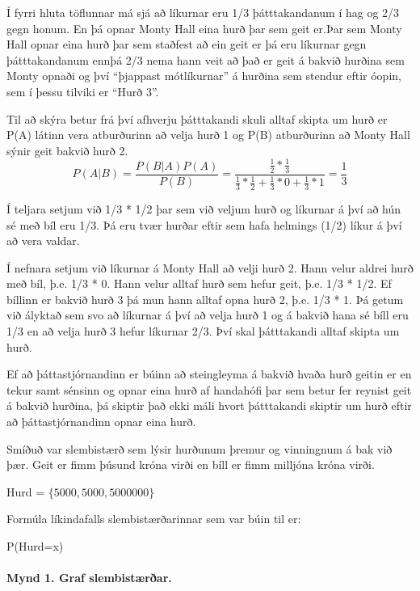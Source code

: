 \documentclass[
]{article}
\begin{document}
Í fyrri hluta töflunnar má sjá að líkurnar eru 1/3 þátttakandanum í hag
og 2/3 gegn honum. En þá opnar Monty Hall eina hurð þar sem geit er.Þar
sem Monty Hall opnar eina hurð þar sem staðfest að ein geit er þá eru
líkurnar gegn þátttakandanum ennþá 2/3 nema hann veit að það er geit á
bakvið hurðina sem Monty opnaði og því ``þjappast mótlíkurnar'' á
hurðina sem stendur eftir óopin, sem í þessu tilviki er ``Hurð 3''.

Til að skýra betur frá því afhverju þátttakandi skuli alltaf skipta um
hurð er P(A) látinn vera atburðurinn að velja hurð 1 og P(B) atburðurinn
að Monty Hall sýnir geit bakvið hurð 2. \[
P(A|B) = \frac
  {P(B|A) P(A)} 
  {P(B)}
=
\frac
  {\frac{1}{2} * \frac{1}{3}}
  {\frac{1}{3} * \frac{1}{2} +
  \frac{1}{3} * 0 
  + \frac{1}{3} * 1}
=
\frac{1}{3}
\]

Í teljara setjum við 1/3 * 1/2 þar sem við veljum hurð og líkurnar á því
að hún sé með bíl eru 1/3. Þá eru tvær hurðar eftir sem hafa helmings
(1/2) líkur á því að vera valdar.

Í nefnara setjum við líkurnar á Monty Hall að velji hurð 2. Hann velur
aldrei hurð með bíl, þ.e. 1/3 * 0. Hann velur alltaf hurð sem hefur
geit, þ.e. 1/3 * 1/2. Ef bíllinn er bakvið hurð 3 þá mun hann alltaf
opna hurð 2, þ.e. 1/3 * 1. Þá getum við ályktað sem svo að líkurnar á
því að velja hurð 1 og á bakvið hana sé bíll eru 1/3 en að velja hurð 3
hefur líkurnar 2/3. Því skal þátttakandi alltaf skipta um hurð.

Ef að þáttastjórnandinn er búinn að steingleyma á bakvið hvaða hurð
geitin er en tekur samt sénsinn og opnar eina hurð af handahófi þar sem
betur fer reynist geit á bakvið hurðina, þá skiptir það ekki máli hvort
þátttakandi skiptir um hurð eftir að þáttastjórnandinn opnar eina hurð.

Smíðuð var slembistærð sem lýsir hurðunum þremur og vinningnum á bak við
þær. Geit er fimm þúsund króna virði en bíll er fimm milljóna króna
virði.

Hurd = \(\{5000, 5000, 5000000\}\)

Formúla líkindafalls slembistærðarinnar sem var búin til er:

P(Hurd=x)

\hypertarget{mynd-1.-graf-slembistuxe6ruxf0ar.}{%
\paragraph{Mynd 1. Graf
slembistærðar.}\label{mynd-1.-graf-slembistuxe6ruxf0ar.}}
\end{document}
